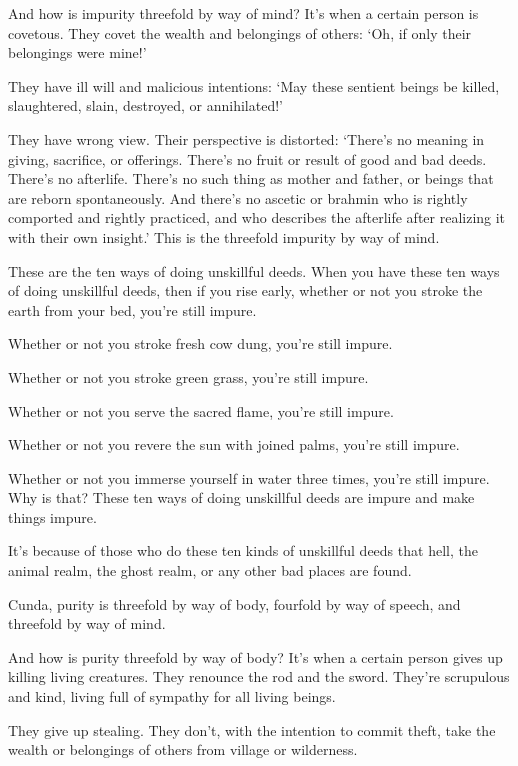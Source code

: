 \documentclass[12pt,openany]{book}%
\begin{document}
And how is impurity threefold by way of mind? It’s when a certain person is covetous. They covet the wealth and belongings of others: ‘Oh, if only their belongings were mine!’ 

They have ill will and malicious intentions: ‘May these sentient beings be killed, slaughtered, slain, destroyed, or annihilated!’ 

They have wrong view. Their perspective is distorted: ‘There’s no meaning in giving, sacrifice, or offerings. There’s no fruit or result of good and bad deeds. There’s no afterlife. There’s no such thing as mother and father, or beings that are reborn spontaneously. And there’s no ascetic or brahmin who is rightly comported and rightly practiced, and who describes the afterlife after realizing it with their own insight.’ This is the threefold impurity by way of mind. 

These are the ten ways of doing unskillful deeds. When you have these ten ways of doing unskillful deeds, then if you rise early, whether or not you stroke the earth from your bed, you’re still impure. 

Whether or not you stroke fresh cow dung, you’re still impure. 

Whether or not you stroke green grass, you’re still impure. 

Whether or not you serve the sacred flame, you’re still impure. 

Whether or not you revere the sun with joined palms, you’re still impure. 

Whether or not you immerse yourself in water three times, you’re still impure. Why is that? These ten ways of doing unskillful deeds are impure and make things impure. 

It’s because of those who do these ten kinds of unskillful deeds that hell, the animal realm, the ghost realm, or any other bad places are found. 

Cunda, purity is threefold by way of body, fourfold by way of speech, and threefold by way of mind. 

And how is purity threefold by way of body? It’s when a certain person gives up killing living creatures. They renounce the rod and the sword. They’re scrupulous and kind, living full of sympathy for all living beings. 

They give up stealing. They don’t, with the intention to commit theft, take the wealth or belongings of others from village or wilderness. 
\end{document}
